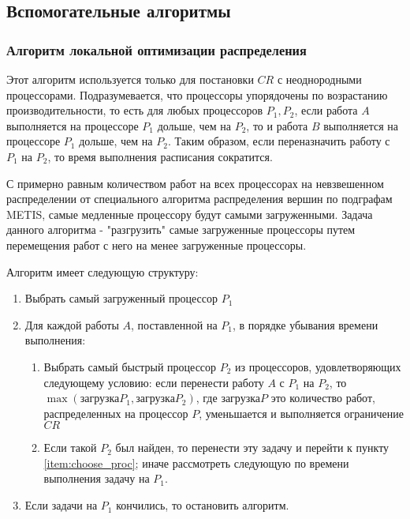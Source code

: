 \subsection{Вспомогательные алгоритмы}

\subsubsection{Алгоритм локальной оптимизации распределения} \label{partition_optimization}

Этот алгоритм используется только для постановки $CR$ с неоднородными процессорами. Подразумевается, что процессоры упорядочены по возрастанию производительности, то есть для любых процессоров $P_1, P_2$, если работа $A$ выполняется на процессоре $P_1$ дольше, чем на $P_2$, то и работа $B$ выполняется на процессоре $P_1$ дольше, чем на $P_2$. Таким образом, если переназначить работу с $P_1$ на $P_2$, то время выполнения расписания сократится.

С примерно равным количеством работ на всех процессорах на невзвешенном распределении от специального алгоритма распределения вершин по подграфам METIS, самые медленные процессору будут самыми загруженными. Задача данного алгоритма - "разгрузить" самые загруженные процессоры путем перемещения работ с него на менее загруженные процессоры.

Алгоритм имеет следующую структуру:
\begin{enumerate}
    \item Выбрать самый загруженный процессор $P_1$
    \item Для каждой работы $A$, поставленной на $P_1$, в порядке убывания времени выполнения:
          \begin{enumerate}
              \item \label{item:choose_proc} Выбрать самый быстрый процессор $P_2$ из процессоров, удовлетворяющих следующему условию: если перенести работу $A$ с $P_1$ на $P_2$, то $\max(\text{загрузка} P_1, \text{загрузка} P_2)$, где $\text{загрузка}P$ это количество работ, распределенных на процессор $P$, уменьшается и выполняется ограничение $CR$
              \item Если такой $P_2$ был найден, то перенести эту задачу и перейти к пункту \ref{item:choose_proc}; иначе рассмотреть следующую по времени выполнения задачу на $P_1$.
          \end{enumerate}
    \item Если задачи на $P_1$ кончились, то остановить алгоритм.
\end{enumerate}

